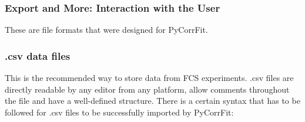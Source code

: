 \subsubsection{Export and More: Interaction with the User}
These are file formats that were designed for PyCorrFit.


\subsubsection{.csv data files}
\label{text:csv}
This is the recommended way to store data from FCS experiments. \mytilde .csv files are directly readable by any editor from any platform, allow comments throughout the file and have a well-defined structure. There is a certain syntax that has to be followed for \mytilde .csv files to be successfully imported by PyCorrFit:


